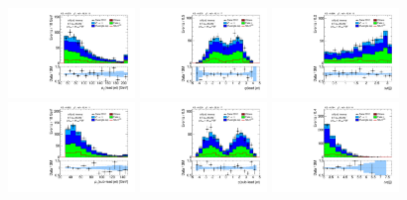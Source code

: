 \clearpage

\begin{figure}[!htpb]
  \includegraphics[width=0.30\textwidth]{figures/analysis/vbf-topCR/jet-1-pt}
  \includegraphics[width=0.30\textwidth]{figures/analysis/vbf-topCR/jet-1-eta}
  \includegraphics[width=0.30\textwidth]{figures/analysis/vbf-topCR/jets-dphi} \\
  \includegraphics[width=0.30\textwidth]{figures/analysis/vbf-topCR/jet-2-pt}
  \includegraphics[width=0.30\textwidth]{figures/analysis/vbf-topCR/jet-2-eta}
  \includegraphics[width=0.30\textwidth]{figures/analysis/vbf-topCR/jets-deta} \\

\end{figure}
